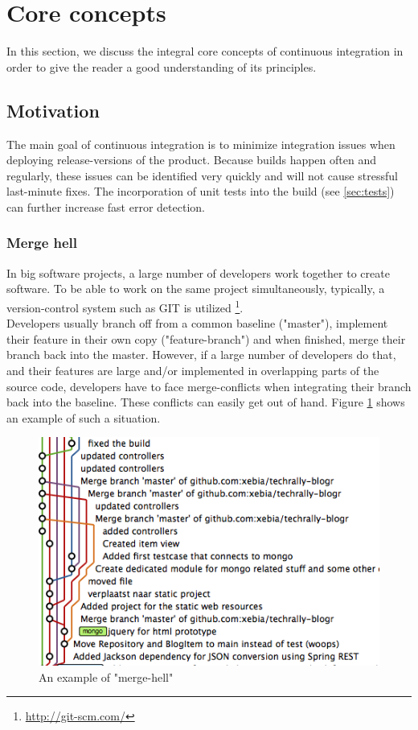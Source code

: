 \section{Core concepts}\label{sec:core-concepts}

In this section, we discuss the integral core concepts of continuous integration
in order to give the reader a good understanding of its principles.

\subsection{Motivation}\label{sec:motivation}

The main goal of continuous integration is to minimize integration issues when
deploying release-versions of the product. Because builds happen often and
regularly, these issues can be identified very quickly and will not cause
stressful last-minute fixes. The incorporation of unit tests into the
build (see \ref{sec:tests}) can further increase fast error detection.

\subsubsection{Merge hell}

In big software projects, a large number of developers work together to create
software. To be able to work on the same project simultaneously, typically, a
version-control system such as GIT is utilized
\footnote{\url{http://git-scm.com/}}.\\

Developers usually branch off from a common baseline ("master"), implement their
feature in their own copy ("feature-branch") and when finished, merge their
branch back into the master. However, if a large number of developers do that,
and their features are large and/or implemented in overlapping parts of the
source code, developers have to face merge-conflicts when integrating their
branch back into the baseline. These conflicts can easily get out of hand.
Figure \ref{fig:merge-hell} shows an example of such a situation.

\begin{figure}[h]
    \centering
    \includegraphics[width=0.6\linewidth]{images/merge-hell.png}
    \caption{An example of "merge-hell" \cite{mooij:2010}}
    \label{fig:merge-hell}
\end{figure}

